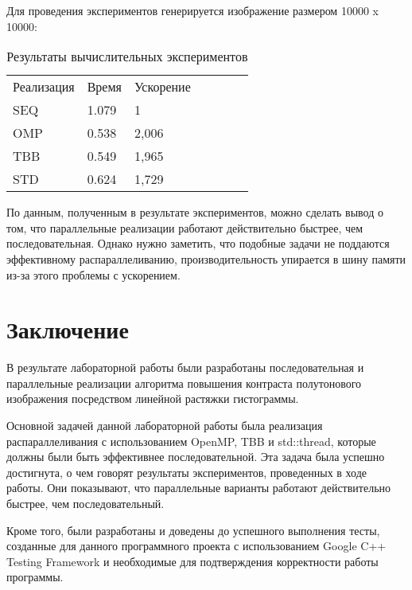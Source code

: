 \documentclass{report}
\begin{document}
\par Для проведения экспериментов генерируется изображение размером 10000 x 10000:
\\

\begin{table}[!h]
\begin{center}
\begin{tabular}{lllllll}
Реализация & Время & Ускорение   \\
SEQ        & 1.079 & 1           \\
OMP        & 0.538 & 2,006       \\
TBB        & 0.549 & 1,965       \\
STD        & 0.624 & 1,729        \\

\end{tabular}
\end{center}
\caption{Результаты вычислительных экспериментов}
\centering
\end{table}

\par По данным, полученным в результате экспериментов, можно сделать вывод о том, что параллельные реализации работают действительно быстрее, чем последовательная. Однако нужно заметить, что подобные задачи не поддаются эффективному распараллеливанию, производительность упирается в шину памяти из-за этого проблемы с ускорением.
\newpage

\section*{Заключение}
В результате лабораторной работы были разработаны последовательная и параллельные реализации алгоритма повышения контраста полутонового изображения посредством линейной растяжки гистограммы.
\par Основной задачей данной лабораторной работы была реализация распараллеливания с использованием OpenMP, TBB и std::thread, которые должны были быть эффективнее последовательной. Эта задача была успешно достигнута, о чем говорят результаты экспериментов, проведенных в ходе работы. Они показывают, что параллельные варианты работают действительно быстрее, чем последовательный.
\par Кроме того, были разработаны и доведены до успешного выполнения тесты, созданные для данного программного проекта с использованием Google C++ Testing Framework и необходимые для подтверждения корректности работы программы.
\newpage
\end{document}

